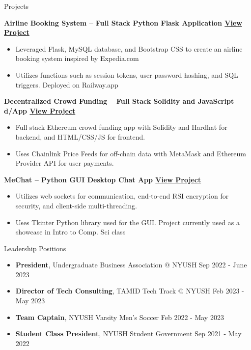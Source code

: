 \documentclass{resume} %
\begin{document}
\begin{rSection}{Projects}

	\textbf{Airline Booking System – Full Stack Python Flask Application \href{https://github.com/larry-lime/airline-ticket-system}{View Project}}
	\begin{itemize}
		\item Leveraged Flask, MySQL database, and Bootstrap CSS to create an airline booking system inspired by Expedia.com
		\item Utilizes functions such as session tokens, user password hashing, and SQL triggers. Deployed on Railway.app
	\end{itemize}

	\textbf{Decentralized Crowd Funding – Full Stack Solidity and JavaScript d/App \href{https://lawrencelim.xyz/project/hh-fund-me/}{View Project}}
	\begin{itemize}
		\item Full stack Ethereum crowd funding app with Solidity and Hardhat for backend, and HTML/CSS/JS for frontend.
		\item Uses Chainlink Price Feeds for off-chain data with MetaMask and Ethereum Provider API for user payments.
	\end{itemize}

	\textbf{MeChat – Python GUI Desktop Chat App \href{https://lawrencelim.xyz/project/mechat/}{View Project}}
	\begin{itemize}
		\item Utilizes web sockets for communication, end-to-end RSI encryption for security, and client-side multi-threading.
		\item Uses Tkinter Python library used for the GUI. Project currently used as a showcase in Intro to Comp. Sci class
	\end{itemize}

\end{rSection}

\begin{rSection}{Leadership Positions}
	\begin{itemize}
		\item \textbf{President}{, Undergraduate Business Association @ NYUSH} \hfill Sep 2022 - June 2023
		\item \textbf{Director of Tech Consulting}{, TAMID Tech Track @ NYUSH} \hfill Feb 2023 - May 2023
		\item \textbf{Team Captain}{, NYUSH Varsity Men's Soccer} \hfill Feb 2022 - May 2023
		\item \textbf{Student Class President}{, NYUSH Student Government} \hfill Sep 2021 - May 2022
	\end{itemize}
\end{rSection}
\end{document}
